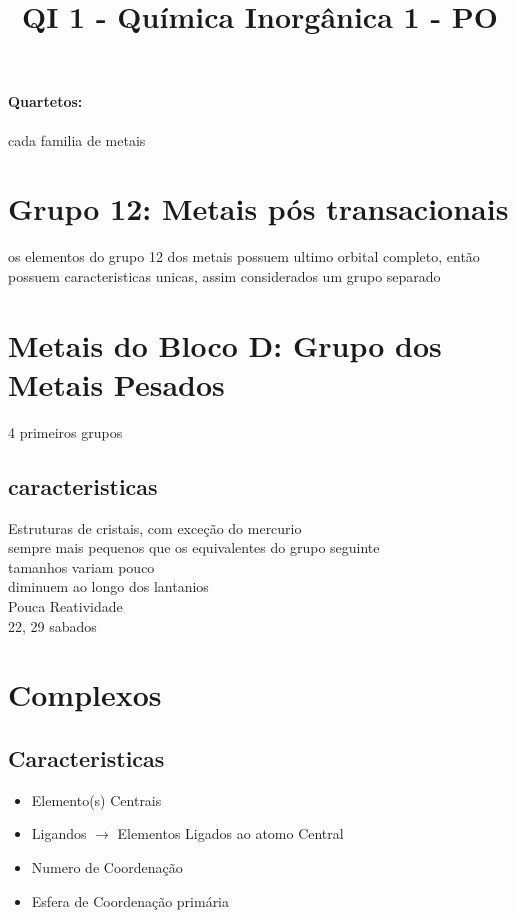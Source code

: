 \documentclass[12pt]{article}
\begin{document}
\title{QI 1 - Química Inorgânica 1 - PO}
\maketitle
\tableofcontents

\paragraph{Quartetos: }
cada familia de metais

\section{Grupo 12: Metais pós transacionais}
os elementos do grupo 12 dos metais possuem ultimo orbital completo, então possuem caracteristicas unicas, assim considerados um grupo separado

\section{Metais do Bloco D: Grupo dos Metais Pesados}
4 primeiros grupos
\subsection{caracteristicas}
Estruturas de cristais, com exceção do mercurio \\
sempre mais pequenos que os equivalentes do grupo seguinte\\
tamanhos variam pouco\\ 
diminuem ao longo dos lantanios\\
Pouca Reatividade\\

22, 29 sabados

\section{Complexos}
\subsection{Caracteristicas}
\begin{itemize}
\item Elemento(s) Centrais
\item Ligandos $\to$ Elementos Ligados ao atomo Central
\item Numero de Coordenação
\item Esfera de Coordenação primária
\end{itemize}
\end{document}

